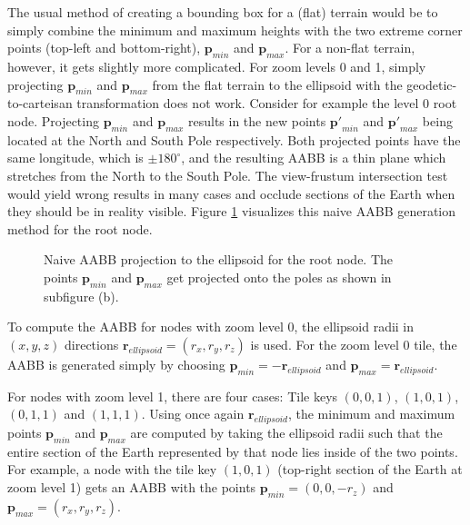 The usual method of creating a bounding box for a (flat) terrain 
would be to simply combine the minimum and maximum heights with the two extreme corner points (top-left and bottom-right),
$\mathbf{p}_{min}$ and $\mathbf{p}_{max}$.
For a non-flat terrain, however, it gets slightly more complicated.
For zoom levels 0 and 1, simply projecting $\mathbf{p}_{min}$ and $\mathbf{p}_{max}$ from 
the flat terrain to the ellipsoid with the geodetic-to-carteisan transformation does not work.
Consider for example the level 0 root node. Projecting $\mathbf{p}_{min}$ and $\mathbf{p}_{max}$
results in the new points $\mathbf{p'}_{min}$ and $\mathbf{p'}_{max}$ being located at the North and South Pole respectively.
Both projected points have the same longitude, which is $\pm 180^{\circ}$, and 
the resulting AABB is a thin plane which stretches from the North to the South Pole.
The view-frustum intersection test would yield wrong results in many cases 
and occlude sections of the Earth when they should be in reality visible.
Figure \ref{fig:earth-aabb-wrong} visualizes this naive AABB generation method for the root node.

\begin{figure}[H]
  \centering
  \qquad
  \caption{Naive AABB projection to the ellipsoid for the root node. The points $\mathbf{p}_{min}$ and $\mathbf{p}_{max}$
  get projected onto the poles as shown in subfigure (b).}\label{fig:earth-aabb-wrong}
\end{figure}

To compute the AABB for nodes with zoom level 0, the ellipsoid radii in $(x,y,z)$ directions
$\mathbf{r}_{ellipsoid} = (r_x, r_y, r_z)$ is used. For the zoom level 0 tile, the AABB is generated 
simply by choosing $\mathbf{p}_{min} = -\mathbf{r}_{ellipsoid}$ and 
$\mathbf{p}_{max} = \mathbf{r}_{ellipsoid}$. 

For nodes with zoom level 1, there are four cases: Tile keys $(0,0,1)$, $(1,0,1)$, $(0,1,1)$ and $(1,1,1)$.
Using once again $\mathbf{r}_{ellipsoid}$, the minimum and maximum points $\mathbf{p}_{min}$ and $\mathbf{p}_{max}$ 
are computed by taking the ellipsoid radii such that the 
entire section of the Earth represented by that node lies inside of the two points.
For example, a node with the tile key $(1,0,1)$ (top-right section of the Earth at zoom level 1) gets an AABB with the points 
$\mathbf{p}_{min} = (0,0,-r_z)$ and $\mathbf{p}_{max} = (r_x,r_y,r_z)$.

